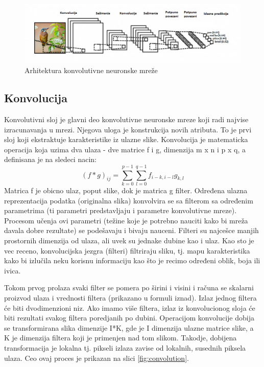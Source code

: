 \documentclass[a4paper]{article}
\begin{document}


\begin{figure}[h!]
\begin{center}
\includegraphics[scale=0.62]{cnn_layers.jpg}
\end{center}
\caption{Arhitektura konvolutivne neuronske mreže}
\label{fig:cnn_layers}
\end{figure}


\subsection{Konvolucija}
\label{konvolucija}

Konvolutivni sloj je glavni deo konvolutivne neuronske mreze koji radi najvise izracunavanja u mrezi. Njegova uloga je konstrukcija novih atributa. To je prvi sloj koji ekstraktuje karakteristike iz ulazne slike. Konvolucija je matematicka operacija koja uzima dva ulaza - dve matrice f i g, dimenzija m x n i p x q, a definisana je na sledeci nacin:
$$(f * g)_{ij} = \sum_{k=0}^{p-1} \sum_{l=0}^{q-1} f_{i-k, i-l}g_{k, l}$$
Matrica f je obicno ulaz, poput slike, dok je matrica g filter. Određena ulazna reprezentacija podatka (originalna slika) konvolvira se sa filterom sa određenim parametrima (ti parametri predstavljaju i parametre konvolutivne mreze). Procesom učenja ovi parametri (težine koje je potrebno nauciti kako bi mreža davala dobre rezultate) se podešavaju i bivaju nauceni. Filteri su najcešce manjih prostornih dimenzija od ulaza, ali uvek su jednake dubine kao i ulaz. Kao sto je vec receno, konvolucijska jezgra (filteri) filtriraju sliku, tj. mapu karakteristika kako bi izlučila neku korisnu informaciju kao što je recimo određeni oblik, boja ili ivica.

Tokom prvog prolaza svaki filter se pomera po širini i visini i računa se skalarni proizvod ulaza i vrednosti filtera (prikazano u formuli iznad). Izlaz jednog filtera će biti dvodimenzioni niz. Ako imamo više filtera, izlaz iz konvolucionog sloja će biti rezultati svakog filtera poredjanih po dubini. Operacijom konvolucije dobija se transformirana slika dimenzije I*K, gde je I dimenzija ulazne matrice slike, a K je dimenzija filtera koji je primenjen nad tom slikom. Takodje, dobijena transformacija je lokalna tj. pikseli izlaza zavise od lokalnih, susednih piksela ulaza. Ceo ovaj proces je prikazan na slici \ref{fig:convolution}.
\end{document}
